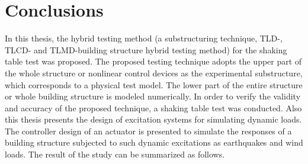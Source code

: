 \chapter{Conclusions}

In this thesis, the hybrid testing method (a substructuring technique, TLD-, TLCD- and TLMD-building structure hybrid testing method) for the shaking table test was proposed. The proposed testing technique adopts the upper part of the whole structure or nonlinear control devices as the experimental substructure, which corresponds to a physical test model. The lower part of the entire structure or whole building structure is modeled numerically. In order to verify the validity and accuracy of the proposed technique, a shaking table test was conducted. Also this thesis presents the design of excitation systems for simulating dynamic loads. The controller design of an actuator is presented to simulate the responses of a building structure subjected to such dynamic excitations as earthquakes and wind loads. The result of the study can be summarized as follows.


